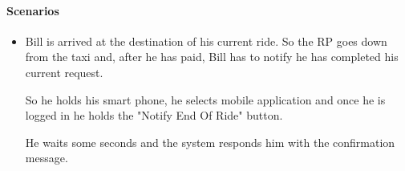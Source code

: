 \paragraph{Scenarios}
\begin{itemize}
	\item Bill is arrived at the destination of his current ride. So the RP goes down from the taxi and, after he has paid, Bill has to notify he has completed his current request. \par So he holds his smart phone, he selects \myTaxiService{} mobile application and once he is logged in he holds the "Notify End Of Ride" button. \par He waits some seconds and the system responds him with the confirmation message.
\end{itemize}
